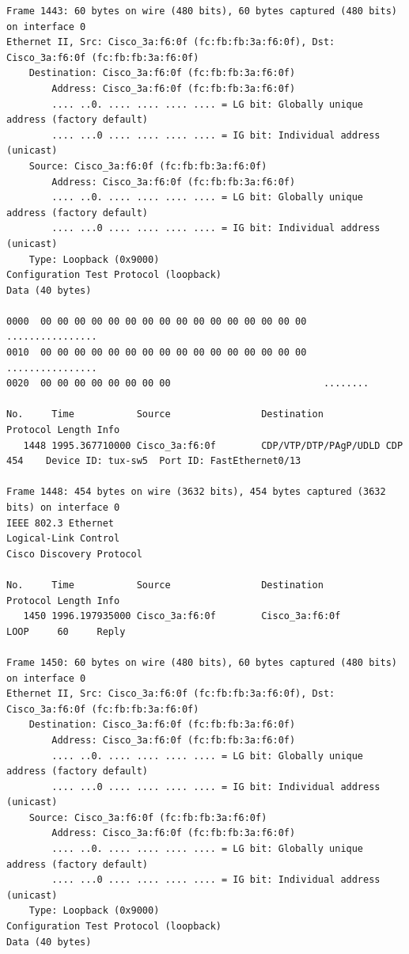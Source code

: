 \documentclass[a4paper,11pt]{article}
\begin{document}
\begin{lstlisting}
Frame 1443: 60 bytes on wire (480 bits), 60 bytes captured (480 bits) on interface 0
Ethernet II, Src: Cisco_3a:f6:0f (fc:fb:fb:3a:f6:0f), Dst: Cisco_3a:f6:0f (fc:fb:fb:3a:f6:0f)
    Destination: Cisco_3a:f6:0f (fc:fb:fb:3a:f6:0f)
        Address: Cisco_3a:f6:0f (fc:fb:fb:3a:f6:0f)
        .... ..0. .... .... .... .... = LG bit: Globally unique address (factory default)
        .... ...0 .... .... .... .... = IG bit: Individual address (unicast)
    Source: Cisco_3a:f6:0f (fc:fb:fb:3a:f6:0f)
        Address: Cisco_3a:f6:0f (fc:fb:fb:3a:f6:0f)
        .... ..0. .... .... .... .... = LG bit: Globally unique address (factory default)
        .... ...0 .... .... .... .... = IG bit: Individual address (unicast)
    Type: Loopback (0x9000)
Configuration Test Protocol (loopback)
Data (40 bytes)

0000  00 00 00 00 00 00 00 00 00 00 00 00 00 00 00 00   ................
0010  00 00 00 00 00 00 00 00 00 00 00 00 00 00 00 00   ................
0020  00 00 00 00 00 00 00 00                           ........

No.     Time           Source                Destination           Protocol Length Info
   1448 1995.367710000 Cisco_3a:f6:0f        CDP/VTP/DTP/PAgP/UDLD CDP      454    Device ID: tux-sw5  Port ID: FastEthernet0/13  

Frame 1448: 454 bytes on wire (3632 bits), 454 bytes captured (3632 bits) on interface 0
IEEE 802.3 Ethernet 
Logical-Link Control
Cisco Discovery Protocol

No.     Time           Source                Destination           Protocol Length Info
   1450 1996.197935000 Cisco_3a:f6:0f        Cisco_3a:f6:0f        LOOP     60     Reply

Frame 1450: 60 bytes on wire (480 bits), 60 bytes captured (480 bits) on interface 0
Ethernet II, Src: Cisco_3a:f6:0f (fc:fb:fb:3a:f6:0f), Dst: Cisco_3a:f6:0f (fc:fb:fb:3a:f6:0f)
    Destination: Cisco_3a:f6:0f (fc:fb:fb:3a:f6:0f)
        Address: Cisco_3a:f6:0f (fc:fb:fb:3a:f6:0f)
        .... ..0. .... .... .... .... = LG bit: Globally unique address (factory default)
        .... ...0 .... .... .... .... = IG bit: Individual address (unicast)
    Source: Cisco_3a:f6:0f (fc:fb:fb:3a:f6:0f)
        Address: Cisco_3a:f6:0f (fc:fb:fb:3a:f6:0f)
        .... ..0. .... .... .... .... = LG bit: Globally unique address (factory default)
        .... ...0 .... .... .... .... = IG bit: Individual address (unicast)
    Type: Loopback (0x9000)
Configuration Test Protocol (loopback)
Data (40 bytes)


\end{lstlisting}
\end{document}
